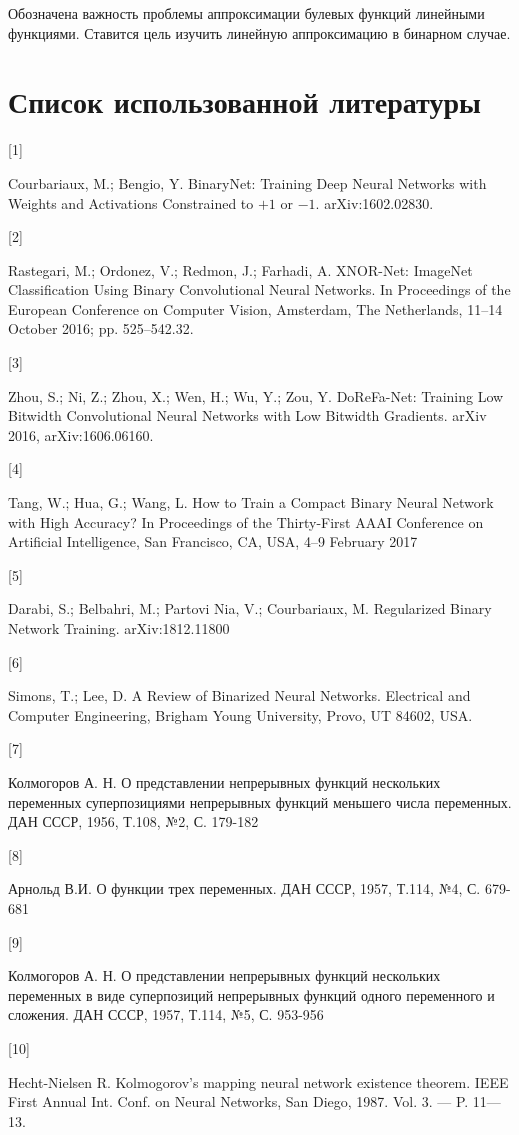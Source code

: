 \documentclass[a4paper, 14pt]{extarticle}
\begin{document}
    Обозначена важность проблемы аппроксимации булевых функций линейными функциями. Ставится цель изучить линейную аппроксимацию в бинарном случае.
\newpage


\section{Список использованной литературы}
    \hypertarget{p1}{[1]} Courbariaux, M.; Bengio, Y. BinaryNet: Training Deep Neural Networks with Weights and Activations Constrained to $+1$ or $-1$. arXiv:1602.02830.
    
    \hypertarget{p2}{[2]} Rastegari, M.; Ordonez, V.; Redmon, J.; Farhadi, A. XNOR-Net: ImageNet Classification Using Binary Convolutional Neural Networks. In Proceedings of the European Conference on Computer Vision, Amsterdam, The Netherlands, 11–14 October 2016; pp. 525–542.32.
    
    \hypertarget{p3}{[3]} Zhou, S.; Ni, Z.; Zhou, X.; Wen, H.; Wu, Y.; Zou, Y. DoReFa-Net: Training Low Bitwidth Convolutional Neural Networks with Low Bitwidth Gradients. arXiv 2016, arXiv:1606.06160.
    
    \hypertarget{p4}{[4]} Tang, W.; Hua, G.; Wang, L. How to Train a Compact Binary Neural Network with High Accuracy? In Proceedings of the Thirty-First AAAI Conference on Artificial Intelligence, San Francisco, CA, USA, 4–9 February 2017
    
    \hypertarget{p5}{[5]} Darabi, S.; Belbahri, M.; Partovi Nia, V.; Courbariaux, M. Regularized Binary Network Training. arXiv:1812.11800
    
    \hypertarget{p6}{[6]} Simons, T.; Lee, D. A Review of Binarized Neural Networks. Electrical and Computer Engineering, Brigham Young University, Provo, UT 84602, USA.
    
    \hypertarget{p7}{[7]} Колмогоров А. Н. О представлении непрерывных функций нескольких переменных суперпозициями непрерывных функций меньшего числа переменных. ДАН СССР, 1956, Т.108, №2, С. 179-182
    
    \hypertarget{p7}{[8]} Арнольд В.И. О функции трех переменных. ДАН СССР, 1957, Т.114, №4, С. 679-681
    
    \hypertarget{p7}{[9]} Колмогоров А. Н. О представлении непрерывных функций нескольких переменных в виде суперпозиций непрерывных функций одного переменного и сложения. ДАН СССР, 1957, Т.114, №5, С. 953-956
    
    \hypertarget{p7}{[10]} Hecht-Nielsen R. Kolmogorov’s mapping neural network existence theorem. IEEE First Annual Int. Conf. on Neural Networks, San Diego, 1987. Vol. 3. — P. 11—13.
 
    
\end{document}
